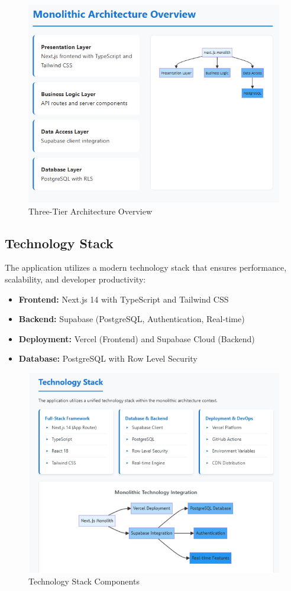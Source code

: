 \begin{figure}[hbt!]
    \centering
    \includegraphics[width=0.9\linewidth]{img/chap_02/architecture_overview.png}
    \caption{Three-Tier Architecture Overview}
    \label{fig:architecture_overview}
\end{figure}

\subsection{Technology Stack}
The application utilizes a modern technology stack that ensures performance, scalability, and developer productivity:

\begin{itemize}
\item \textbf{Frontend:} Next.js 14 with TypeScript and Tailwind CSS
\item \textbf{Backend:} Supabase (PostgreSQL, Authentication, Real-time)
\item \textbf{Deployment:} Vercel (Frontend) and Supabase Cloud (Backend)
\item \textbf{Database:} PostgreSQL with Row Level Security
\end{itemize}

\begin{figure}[hbt!]
    \centering
    \includegraphics[width=0.85\linewidth]{img/chap_02/technology_stack.png}
    \caption{Technology Stack Components}
    \label{fig:technology_stack}
\end{figure}

